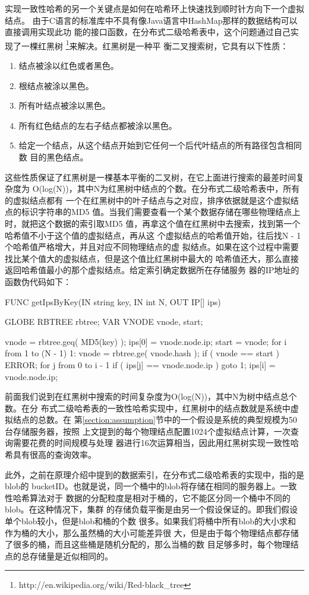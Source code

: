 实现一致性哈希的另一个关键点是如何在哈希环上快速找到顺时针方向下一个虚拟结点。
由于C语言的标准库中不具有像Java语言中HashMap那样的数据结构可以直接调用实现此功
能的接口函数，在分布式二级哈希表中，这个问题通过自己实现了一棵红黑树
\footnote{http://en.wikipedia.org/wiki/Red-black\_tree}来解决。红黑树是一种平
衡二叉搜索树，它具有以下性质：
\begin{enumerate}
  \item 结点被涂以红色或者黑色。
  \item 根结点被涂以黑色。
  \item 所有叶结点被涂以黑色。
  \item 所有红色结点的左右子结点都被涂以黑色。
  \item 给定一个结点，从这个结点开始到它任何一个后代叶结点的所有路径包含相同数
  目的黑色结点。
\end{enumerate}
这些性质保证了红黑树是一棵基本平衡的二叉树，在它上面进行搜索的最差时间复杂度为
O(log(N))，其中N为红黑树中结点的个数。在分布式二级哈希表中，所有的虚拟结点都有
一个在红黑树中的叶子结点与之对应，排序依据就是这个虚拟结点的标识字符串的MD5
值。当我们需要查看一个某个数据存储在哪些物理结点上时，就把这个数据的索引取MD5
值，再拿这个值在红黑树中去搜索，找到第一个哈希值不小于这个值的虚拟结点，再从这
个虚拟结点的哈希值开始，往后找N - 1个哈希值严格增大，并且对应不同物理结点的虚
拟结点。如果在这个过程中需要找比某个值大的虚拟结点，但是这个值比红黑树中最大的
哈希值还大，那么直接返回哈希值最小的那个虚拟结点。给定索引确定数据所在存储服务
器的IP地址的函数伪代码如下：
\begin{code}
  FUNC getIpsByKey(IN string key, IN int N, OUT IP[] ips)
  {
    GLOBE RBTREE rbtree;
    VAR VNODE vnode, start;

    vnode = rbtree.geq( MD5(key) );
    ips[0] = vnode.node.ip;
    start = vnode;
    for i from 1 to (N - 1)
    {
1:    vnode = rbtree.ge( vnode.hash );
      if ( vnode == start ) ERROR;
      for j from 0 to i - 1
      {
        if ( ips[j] == vnode.node.ip ) goto 1;
      }
      ips[i] = vnode.node.ip;
    }
  }
\end{code}
前面我们说到在红黑树中搜索的时间复杂度为O(log(N))，其中N为树中结点总个数。在分
布式二级哈希表的一致性哈希实现中，红黑树中的结点数就是系统中虚拟结点的总数。在
第\ref{section:assumption}节中的一个假设是系统的典型规模为50台存储服务器，按照
上文提到的每个物理结点配置1024个虚拟结点计算，一次查询需要花费的时间规模与处理
器进行16次运算相当，因此用红黑树实现一致性哈希具有很高的查询效率。

此外，之前在原理介绍中提到的数据索引，在分布式二级哈希表的实现中，指的是blob的
bucketID。也就是说，同一个桶中的blob将存储在相同的服务器上。一致性哈希算法对于
数据的分配粒度是相对于桶的，它不能区分同一个桶中不同的blob。在这种情况下，集群
的存储负载平衡是由另一个假设保证的。即我们假设单个blob较小，但是blob和桶的个数
很多。如果我们将桶中所有blob的大小求和作为桶的大小，那么虽然桶的大小可能差异很
大，但是由于每个物理结点都存储了很多的桶，而且这些桶是随机分配的，那么当桶的数
目足够多时，每个物理结点的总存储量是近似相同的。

